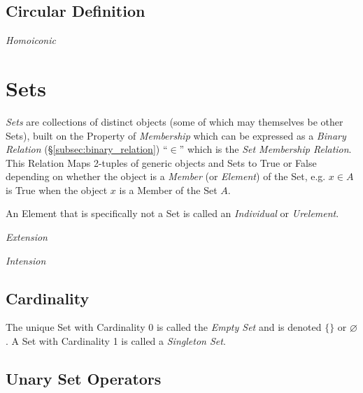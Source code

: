 \documentclass{article}
\begin{document}
\subsection{Circular Definition}\label{subsec:circular_definition}

\emph{Homoiconic}



\section{Sets}\label{sec:sets}

\emph{Sets} are collections of distinct objects (some of which may
themselves be other Sets), built on the Property of \emph{Membership}
which can be expressed as a \emph{Binary Relation}
(\S\ref{subsec:binary_relation}) ``$\in$'' which is the \emph{Set
  Membership Relation}. This Relation Maps 2-tuples of generic objects
and Sets to True or False depending on whether the object is a
\emph{Member} (or \emph{Element}) of the Set, e.g. $x \in A$ is True
when the object $x$ is a Member of the Set $A$.

An Element that is specifically not a Set is called an
\emph{Individual} or \emph{Urelement}.

\emph{Extension}

\emph{Intension}



\subsection{Cardinality}

The unique Set with Cardinality 0 is called the \emph{Empty Set} and
is denoted $\{\}$ or $\varnothing$. A Set with Cardinality 1 is called a
\emph{Singleton Set}.



\subsection{Unary Set Operators}
\end{document}
